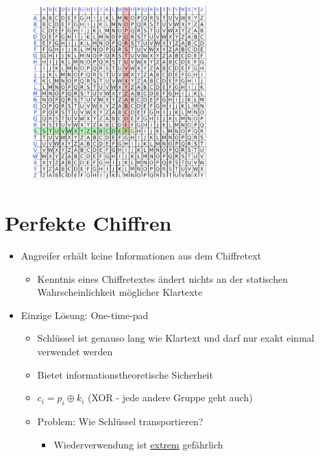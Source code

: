\documentclass[openany]{book}
\begin{document}
\begin{figure}[h!]
    \centering
    \includegraphics[width=0.6\textwidth]{Pics/PolyAlpha2.PNG}
\end{figure}

\section{Perfekte Chiffren}

\begin{itemize}
    \item Angreifer erhält keine Informationen aus dem Chiffretext
    \begin{itemize}
        \item Kenntnis eines Chiffretextes ändert nichts an der statischen Wahrscheinlichkeit möglicher Klartexte
    \end{itemize}
    \item Einzige Lösung: One-time-pad
    \begin{itemize}
        \item Schlüssel ist genauso lang wie Klartext und darf nur exakt einmal verwendet werden
        \item Bietet informationstheoretische Sicherheit
        \item $c_i=p_i\oplus k_i$ (XOR - jede andere Gruppe geht auch)
        \item Problem: Wie Schlüssel transportieren?
        \begin{itemize}
            \item Wiederverwendung ist \underline{extrem} gefährlich
        \end{itemize}
    \end{itemize}
\end{itemize}
\end{document}
